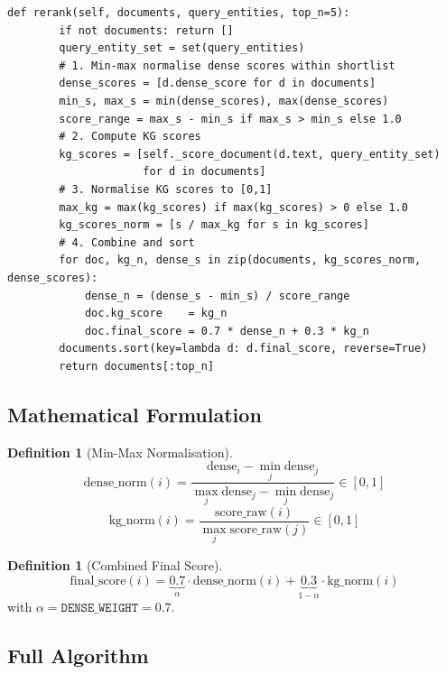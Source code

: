 \documentclass[12pt,a4paper]{article}
\theoremstyle{definition}
\newtheorem{definition}[theorem]{Definition}
\theoremstyle{remark}
\begin{document}
\begin{lstlisting}[caption={\texttt{NERKGReranker.rerank()}}]
    def rerank(self, documents, query_entities, top_n=5):
        if not documents: return []
        query_entity_set = set(query_entities)
        # 1. Min-max normalise dense scores within shortlist
        dense_scores = [d.dense_score for d in documents]
        min_s, max_s = min(dense_scores), max(dense_scores)
        score_range = max_s - min_s if max_s > min_s else 1.0
        # 2. Compute KG scores
        kg_scores = [self._score_document(d.text, query_entity_set)
                     for d in documents]
        # 3. Normalise KG scores to [0,1]
        max_kg = max(kg_scores) if max(kg_scores) > 0 else 1.0
        kg_scores_norm = [s / max_kg for s in kg_scores]
        # 4. Combine and sort
        for doc, kg_n, dense_s in zip(documents, kg_scores_norm, dense_scores):
            dense_n = (dense_s - min_s) / score_range
            doc.kg_score    = kg_n
            doc.final_score = 0.7 * dense_n + 0.3 * kg_n
        documents.sort(key=lambda d: d.final_score, reverse=True)
        return documents[:top_n]
\end{lstlisting}

\subsection{Mathematical Formulation}

\begin{definition}[Min-Max Normalisation]
\[
  \text{dense\_norm}(i) =
  \frac{\text{dense}_i - \min_j \text{dense}_j}
       {\max_j \text{dense}_j - \min_j \text{dense}_j}
  \in [0, 1]
\]
\[
  \text{kg\_norm}(i) =
  \frac{\text{score\_raw}(i)}{\max_j \text{score\_raw}(j)}
  \in [0, 1]
\]
\end{definition}

\begin{definition}[Combined Final Score]
\[
  \text{final\_score}(i) =
  \underbrace{0.7}_{\alpha} \cdot \text{dense\_norm}(i) +
  \underbrace{0.3}_{1-\alpha} \cdot \text{kg\_norm}(i)
\]
with $\alpha = \texttt{DENSE\_WEIGHT} = 0.7$.
\end{definition}

\subsection{Full Algorithm}
\end{document}
